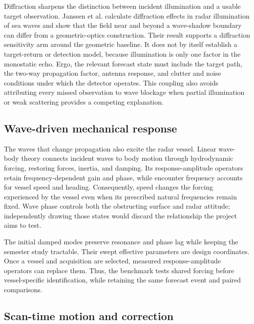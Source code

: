 \documentclass[10pt,letterpaper]{article}
\begin{document}
Diffraction sharpens the distinction between incident illumination and a usable target observation. Janssen et al. calculate diffraction effects in radar illumination of sea waves and show that the field near and beyond a wave-shadow boundary can differ from a geometric-optics construction. \cite{Janssen2026Diffraction} Their result supports a diffraction sensitivity arm around the geometric baseline. It does not by itself establish a target-return or detection model, because illumination is only one factor in the monostatic echo. Ergo, the relevant forecast state must include the target path, the two-way propagation factor, antenna response, and clutter and noise conditions under which the detector operates. This coupling also avoids attributing every missed observation to wave blockage when partial illumination or weak scattering provides a competing explanation.

\subsection{Wave-driven mechanical response}

The waves that change propagation also excite the radar vessel. Linear wave-body theory connects incident waves to body motion through hydrodynamic forcing, restoring forces, inertia, and damping. Its response-amplitude operators retain frequency-dependent gain and phase, while encounter frequency accounts for vessel speed and heading. \cite{MITOCW2002WaveBody} Consequently, speed changes the forcing experienced by the vessel even when its prescribed natural frequencies remain fixed. Wave phase controls both the obstructing surface and radar attitude; independently drawing those states would discard the relationship the project aims to test.

The initial damped modes preserve resonance and phase lag while keeping the semester study tractable. Their swept effective parameters are design coordinates. Once a vessel and acquisition are selected, measured response-amplitude operators can replace them. Thus, the benchmark tests shared forcing before vessel-specific identification, while retaining the same forecast event and paired comparisons.

\subsection{Scan-time motion and correction}
\end{document}
